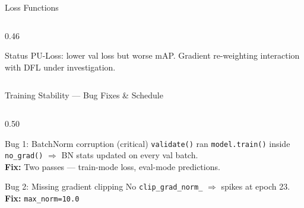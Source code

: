 \documentclass[aspectratio=169, 10pt]{beamer}
\begin{document}
\begin{frame}{Loss Functions}
\begin{columns}[T]
\begin{column}{0.46\textwidth}
      \vspace{4pt}
      \begin{alertblock}{\small Status}
        \small PU-Loss: lower val loss but worse mAP. Gradient re-weighting interaction with DFL under investigation.
      \end{alertblock}
    \end{column}
  \end{columns}
\end{frame}

\begin{frame}{Training Stability — Bug Fixes \& Schedule}
  \begin{columns}[T]
    \begin{column}{0.50\textwidth}
      \begin{block}{\small Bug 1: BatchNorm corruption (critical)}
        \small \texttt{validate()} ran \texttt{model.train()} inside\\
        \texttt{no\_grad()} $\Rightarrow$ BN stats updated on every val batch.\\
        \textbf{Fix:} Two passes — train-mode loss, eval-mode predictions.
      \end{block}
      \begin{block}{\small Bug 2: Missing gradient clipping}
        \small No \texttt{clip\_grad\_norm\_} $\Rightarrow$ spikes at epoch 23.\\
        \textbf{Fix:} \texttt{max\_norm=10.0}
      \end{block}


\end{column}
\end{columns}
\end{frame}
\end{document}
